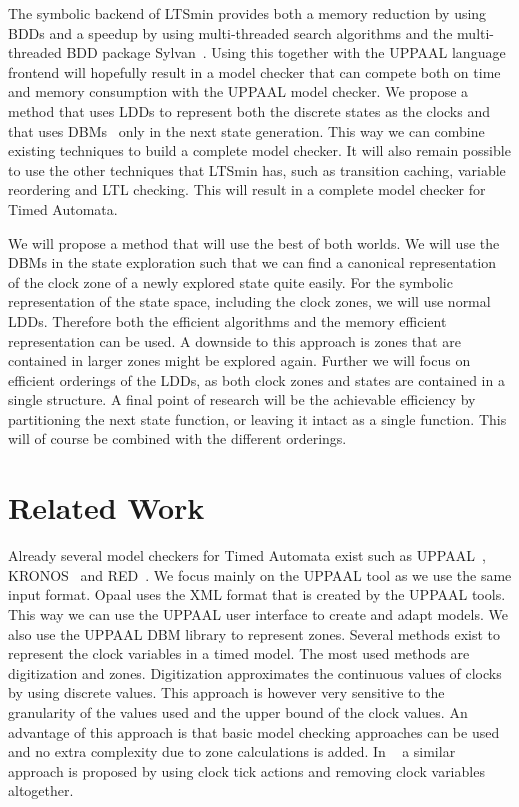 \documentclass[11pt]{article}
\begin{document}
The symbolic backend of LTSmin provides both a memory reduction by using BDDs and a speedup by using multi-threaded search algorithms and the multi-threaded BDD package Sylvan~\cite{sylvan}. Using this together with the UPPAAL language frontend will hopefully result in a model checker that can compete both on time and memory consumption with the UPPAAL model checker. We propose a method that uses LDDs to represent both the discrete states as the clocks and that uses DBMs~\cite{dbmorig, bengtsson2002clocks} only in the next state generation. This way we can combine existing techniques to build a complete model checker. It will also remain possible to use the other techniques that LTSmin has, such as transition caching, variable reordering and LTL checking. This will result in a complete model checker for Timed Automata.

We will propose a method that will use the best of both worlds. We will use the DBMs in the state exploration such that we can find a canonical representation of the clock zone of a newly explored state quite easily. For the symbolic representation of the state space, including the clock zones, we will use normal LDDs. Therefore both the efficient algorithms and the memory efficient representation can be used. A downside to this approach is zones that are contained in larger zones might be explored again. Further we will focus on efficient orderings of the LDDs, as both clock zones and states are contained in a single structure. A final point of research will be the achievable efficiency by partitioning the next state function, or leaving it intact as a single function. This will of course be combined with the different orderings. 

\section{Related Work}
Already several model checkers for Timed Automata exist such as UPPAAL~\cite{UPPAAL}, KRONOS~\cite{kronos} and RED~\cite{crds}. We focus mainly on the UPPAAL tool as we use the same input format. Opaal uses the XML format that is created by the UPPAAL tools. This way we can use the UPPAAL user interface to create and adapt models. We also use the UPPAAL DBM library to represent zones.
Several methods exist to represent the clock variables in a timed model. The most used methods are digitization and zones. 
Digitization approximates the continuous values of clocks by using discrete values. This approach is however very sensitive to the granularity of the values used and the upper bound of the clock values. An advantage of this approach is that basic model checking approaches can be used and no extra complexity due to zone calculations is added. In ~\cite{nguyen2012discrete} a similar approach is proposed by using clock tick actions and removing clock variables altogether. 
\end{document}
